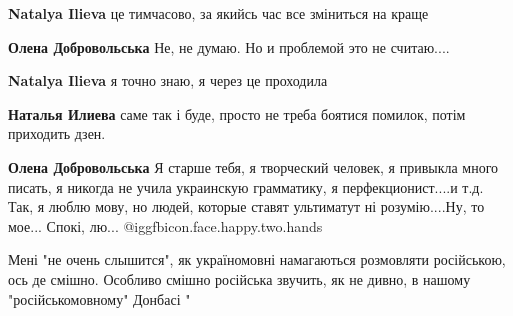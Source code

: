 \begin{itemize}
{\begin{itemize}
{\textbf{Natalya Ilieva} це тимчасово, за якийсь час все зміниться на краще

 
\textbf{Олена Добровольська} Не, не думаю. Но и проблемой это не считаю....

 
\textbf{Natalya Ilieva} я точно знаю, я через це проходила

 
\textbf{Наталья Илиева} саме так і буде, просто не треба боятися помилок, потім приходить дзен.

 
\textbf{Олена Добровольська} Я старше тебя, я творческий человек, я привыкла много писать, я никогда не учила украинскую грамматику, я перфекционист....и т.д. Так, я люблю мову, но людей, которые ставят ультиматут ні розумію....Ну, то мое... Спокі, лю...  
@igg{fbicon.face.happy.two.hands} 

}\end{itemize}

 

Мені "не очень слышится", як україномовні намагаються розмовляти російською,
ось де смішно. Особливо смішно російська звучить, як не дивно, в нашому
"російськомовному" Донбасі "


}
\end{itemize}
